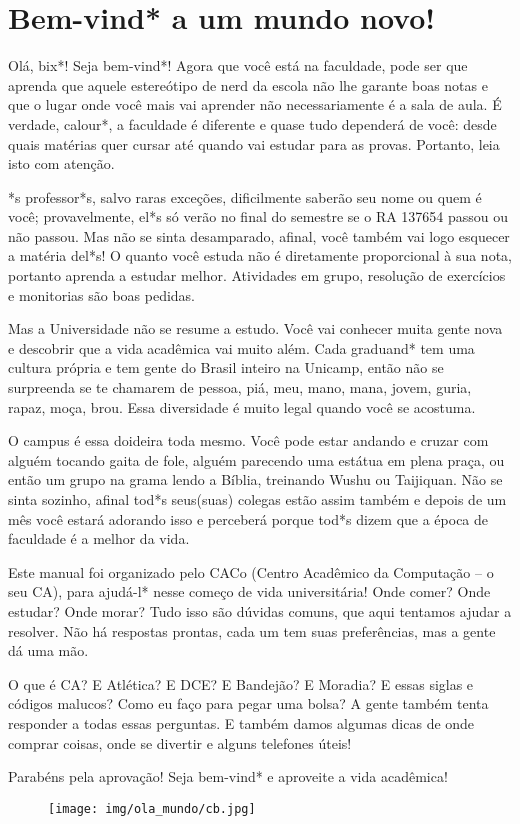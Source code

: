 
\section{Bem-vind* a um mundo novo!}

Olá, bix*! Seja bem-vind*! Agora que você está na faculdade, pode ser que
aprenda que aquele estereótipo de nerd da escola não lhe garante boas notas e
que o lugar onde você mais vai aprender não necessariamente é a sala de aula. É
verdade, calour*, a faculdade é diferente e quase tudo dependerá de você: desde
quais matérias quer cursar até quando vai estudar para as provas. Portanto, leia
isto com atenção.

*s professor*s, salvo raras exceções, dificilmente saberão seu nome ou quem é
você; provavelmente, el*s só verão no final do semestre se o RA 137654  passou
ou não passou. Mas não se sinta desamparado, afinal, você também vai logo
esquecer a matéria del*s! O quanto você estuda não é diretamente proporcional à
sua nota, portanto aprenda a estudar melhor. Atividades em grupo, resolução de
exercícios e monitorias são boas pedidas.

Mas a Universidade não se resume a estudo. Você vai conhecer muita gente nova e
descobrir que a vida acadêmica vai muito além.  Cada graduand* tem uma cultura
própria e tem gente do Brasil inteiro na Unicamp, então não se surpreenda se te
chamarem de pessoa, piá, meu, mano, mana, jovem, guria, rapaz, moça, brou.
Essa diversidade é muito legal quando você se acostuma.

O campus é essa doideira toda mesmo. Você pode estar andando e cruzar com alguém
tocando gaita de fole, alguém parecendo uma estátua em plena praça, ou então um
grupo na grama lendo a Bíblia, treinando Wushu ou Taijiquan. Não se sinta
sozinho, afinal tod*s seus(suas) colegas estão assim também e depois de um mês você
estará adorando isso e perceberá porque tod*s dizem que a época de faculdade é a
melhor da vida.

Este manual foi organizado pelo CACo (Centro Acadêmico da Computação -- o seu
CA), para ajudá-l* nesse começo de vida universitária! Onde comer? Onde estudar?
Onde morar? Tudo isso são dúvidas comuns, que aqui tentamos ajudar a resolver.
Não há respostas prontas, cada um tem suas preferências, mas a gente dá uma mão.

O que é CA? E Atlética? E DCE? E Bandejão? E Moradia? E essas siglas e códigos
malucos? Como eu faço para pegar uma bolsa? A gente também tenta responder a todas
essas perguntas. E também damos algumas dicas de onde comprar coisas, onde se
divertir e alguns telefones úteis!

Parabéns pela aprovação! Seja bem-vind* e aproveite a vida acadêmica!
 
\begin{figure}[t]
    \texttt{[image: img/ola\_mundo/cb.jpg]}
\end{figure}
